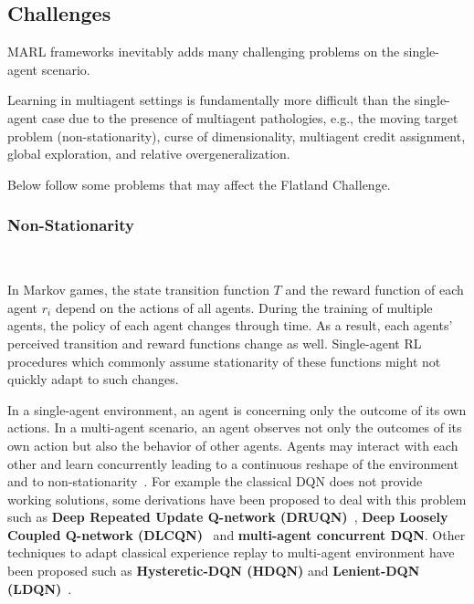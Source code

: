 \documentclass[11pt, a4paper, hidelinks]{report}
\begin{document}
\subsection{Challenges}\label{subsec:challenges}

MARL frameworks inevitably adds many challenging problems on the single-agent scenario.
\begin{quoting}[font=itshape, begintext={"}, endtext={"\cite{Hernandez_Leal_2019}}]
Learning in multiagent settings is fundamentally more difficult than the single-agent case due to the presence of multiagent pathologies, e.g., the moving target problem (non-stationarity), curse of dimensionality, multiagent credit assignment, global exploration, and relative overgeneralization.
\end{quoting}

Below follow some problems that may affect the Flatland Challenge.

\subsubsection{Non-Stationarity}~\newline

\begin{quoting}[font=itshape, begintext={"}, endtext={"\cite{papoudakis2019dealing}}]
In Markov games, the state transition function $T$ and the reward function of each agent $r_i$ depend on the actions of all agents.
During the training of multiple agents, the policy of each agent changes through time.
As a result, each agents’ perceived transition and reward functions change as well.
Single-agent RL procedures which commonly assume stationarity of these functions might not quickly adapt to such changes.
\end{quoting}

In a single-agent environment, an agent is concerning only the outcome of its own actions.
In a multi-agent scenario, an agent observes not only the outcomes of its own action but also the behavior of other agents.
Agents may interact with each other and learn concurrently leading to a continuous reshape of the environment and to non-stationarity~\cite{zhang2019multiagent}.
For example the classical DQN does not provide working solutions, some derivations have been proposed to deal with this problem such as \textbf{Deep Repeated Update Q-network (DRUQN)}~\cite{castaneda}, \textbf{Deep Loosely Coupled Q-network (DLCQN)}~\cite{castaneda} and \textbf{ multi-agent concurrent DQN}.
Other techniques to adapt classical experience replay to multi-agent environment have been proposed such as \textbf{Hysteretic-DQN (HDQN)} and \textbf{Lenient-DQN (LDQN)}~\cite{Nguyen_2020}.
\end{document}
